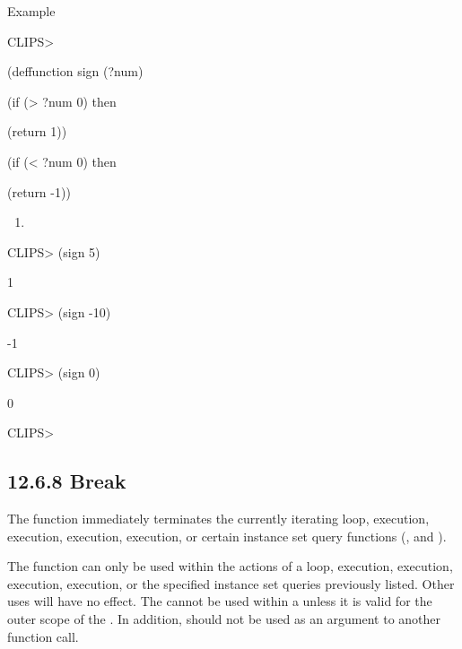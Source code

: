 \documentclass[letterpaper,10pt,english]{sphinxmanual}
\begin{document}

\begin{sphinxVerbatim}[commandchars=\\\{\}]
 \PYG{p}{[}\PYG{p}{]}
\end{sphinxVerbatim}

Example

CLIPS\textgreater{}

(deffunction sign (?num)

(if (\textgreater{} ?num 0) then

(return 1))

(if (\textless{} ?num 0) then

(return -1))
\begin{enumerate}
\def\theenumi{\arabic{enumi}}
\def\labelenumi{\theenumi )}
\makeatletter\def\p@enumii{\p@enumi \theenumi )}\makeatother
\setcounter{enumi}{-1}
\item {} 
\end{enumerate}

CLIPS\textgreater{} (sign 5)

1

CLIPS\textgreater{} (sign -10)

-1

CLIPS\textgreater{} (sign 0)

0

CLIPS\textgreater{}


\subsection{12.6.8 Break}
\label{\detokenize{actions:break}}
The  function immediately terminates the currently iterating
 loop,  execution,  execution,
 execution,  execution, or certain instance set
query functions (,  and
).

The  function can only be used within the actions of a
 loop,  execution,  execution,
 execution,  execution, or the specified instance
set queries previously listed. Other uses will have no effect. The
 cannot be used within a  unless it is valid for the
outer scope of the . In addition,  should not be used
as an argument to another function call.
\end{document}
